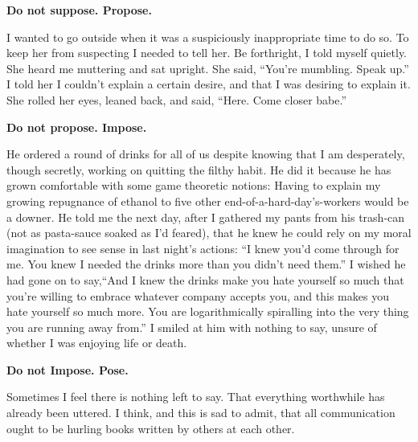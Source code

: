 \documentclass{article}
\begin{document}
\newline

\textbf{Do not suppose. Propose.}
\newline

I wanted to go outside when it was a suspiciously inappropriate time to
do so. To keep her from suspecting I needed to tell her. Be forthright,
I told myself quietly. She heard me muttering and sat upright. She
said, ``You're mumbling. Speak up.'' I told her I couldn't explain
a certain desire, and that I was desiring to explain it. She rolled her
eyes, leaned back, and said, ``Here. Come closer babe.'' \newline
\newline

\textbf{Do not propose. Impose.}
\newline

He ordered a round of drinks for all of us despite knowing that I am
desperately, though secretly, working on quitting the filthy habit. He
did it because he has grown comfortable with some game theoretic
notions: Having to explain my growing repugnance of ethanol to five
other end-of-a-hard-day's-workers would be a downer. He told me the next
day, after I gathered my pants from his trash-can (not as pasta-sauce
soaked as I'd feared), that he knew he could rely on my moral
imagination to see sense in last night's actions: ``I knew you'd come
through for me. You knew I needed the drinks more than you didn't need
them.'' I wished he had gone on to say,``And I knew the drinks make you
hate yourself so much that you're willing to embrace whatever company
accepts you, and this makes you hate yourself so much more. You are
logarithmically spiralling into the very thing you are running away
from.'' I smiled at him with nothing to say, unsure of whether I was
enjoying life or death. \newline \newline


\textbf{Do not Impose. Pose.}
\newline

Sometimes I feel there is nothing left to say. That everything
worthwhile has already been uttered. I think, and this is sad to admit,
that all communication ought to be hurling books written by others at
each other.\newline \newline
\end{document}
